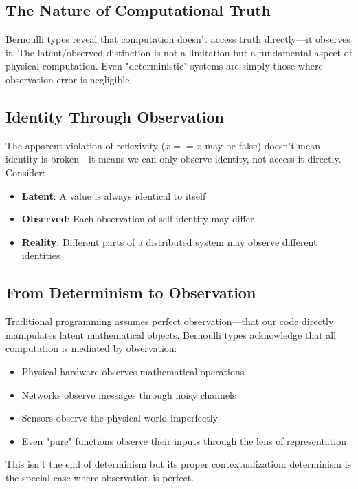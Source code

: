 \documentclass[11pt,final,hidelinks]{article}
\begin{document}
{\subsection{The Nature of Computational Truth}

Bernoulli types reveal that computation doesn't access truth directly—it observes it. The latent/observed distinction is not a limitation but a fundamental aspect of physical computation. Even "deterministic" systems are simply those where observation error is negligible.

\subsection{Identity Through Observation}

The apparent violation of reflexivity ($x == x$ may be false) doesn't mean identity is broken—it means we can only observe identity, not access it directly. Consider:
\begin{itemize}
    \item \textbf{Latent}: A value is always identical to itself
    \item \textbf{Observed}: Each observation of self-identity may differ
    \item \textbf{Reality}: Different parts of a distributed system may observe different identities
\end{itemize}

\subsection{From Determinism to Observation}

Traditional programming assumes perfect observation—that our code directly manipulates latent mathematical objects. Bernoulli types acknowledge that all computation is mediated by observation:
\begin{itemize}
    \item Physical hardware observes mathematical operations
    \item Networks observe messages through noisy channels  
    \item Sensors observe the physical world imperfectly
    \item Even "pure" functions observe their inputs through the lens of representation
\end{itemize}

This isn't the end of determinism but its proper contextualization: determinism is the special case where observation is perfect.

}
\end{document}
